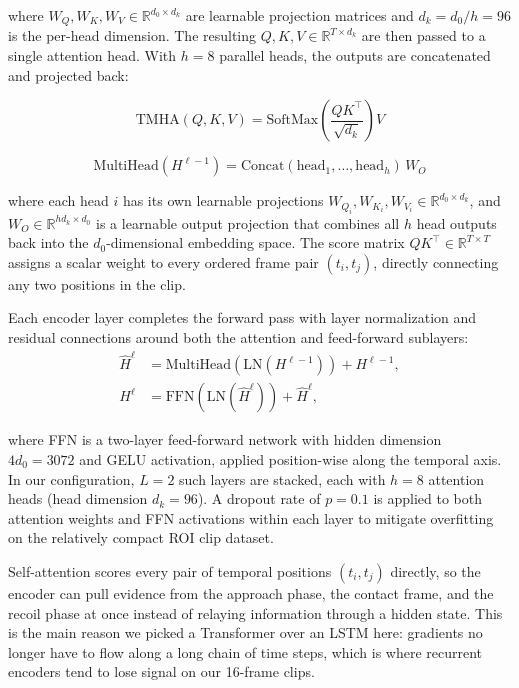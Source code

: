 \documentclass[conference]{IEEEtran}
\begin{document}
\noindent where $W_Q, W_K, W_V \in \mathbb{R}^{d_0 \times d_k}$ are learnable projection matrices and $d_k = d_0 / h = 96$ is the per-head dimension. The resulting $Q, K, V \in \mathbb{R}^{T \times d_k}$ are then passed to a single attention head. With $h = 8$ parallel heads, the outputs are concatenated and projected back:

\begin{equation}
\text{TMHA}(Q, K, V) = \text{SoftMax}\!\left(\frac{QK^{\top}}{\sqrt{d_k}}\right)V
\label{eq:tmha}
\end{equation}

\begin{equation}
\text{MultiHead}(H^{\ell-1}) = \text{Concat}(\text{head}_1, \ldots, \text{head}_h)\,W_O
\label{eq:multihead}
\end{equation}

\noindent where each head $i$ has its own learnable projections $W_{Q_i}, W_{K_i}, W_{V_i} \in \mathbb{R}^{d_0 \times d_k}$, and $W_O \in \mathbb{R}^{h d_k \times d_0}$ is a learnable output projection that combines all $h$ head outputs back into the $d_0$-dimensional embedding space. The score matrix $QK^{\top} \in \mathbb{R}^{T \times T}$ assigns a scalar weight to every ordered frame pair $(t_i, t_j)$, directly connecting any two positions in the clip.

Each encoder layer completes the forward pass with layer normalization and residual connections around both the attention and feed-forward sublayers:
\begin{align}
\hat{H}^{\ell} &= \text{MultiHead}(\text{LN}(H^{\ell-1})) + H^{\ell-1}, \label{eq:temp_attn_res} \\
H^{\ell}       &= \text{FFN}(\text{LN}(\hat{H}^{\ell})) + \hat{H}^{\ell}, \label{eq:temp_ffn_res}
\end{align}

\noindent where FFN is a two-layer feed-forward network with hidden dimension $4d_0 = 3072$ and GELU activation, applied position-wise along the temporal axis. In our configuration, $L = 2$ such layers are stacked, each with $h = 8$ attention heads (head dimension $d_k = 96$). A dropout rate of $p = 0.1$ is applied to both attention weights and FFN activations within each layer to mitigate overfitting on the relatively compact ROI clip dataset.

Self-attention scores every pair of temporal positions $(t_i, t_j)$ directly, so the encoder can pull evidence from the approach phase, the contact frame, and the recoil phase at once instead of relaying information through a hidden state. This is the main reason we picked a Transformer over an LSTM here: gradients no longer have to flow along a long chain of time steps, which is where recurrent encoders tend to lose signal on our 16-frame clips.
\end{document}
